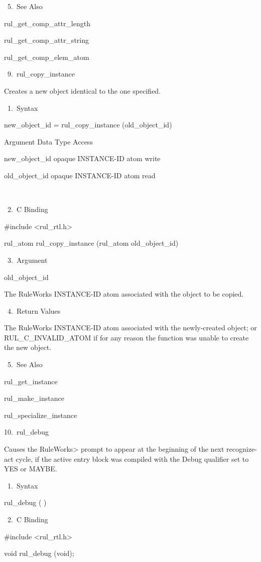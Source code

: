        5. See Also

    rul_get_comp_attr_length

    rul_get_comp_attr_string

    rul_get_comp_elem_atom

 9. rul_copy_instance

    Creates a new object identical to the one
    specified.

       1. Syntax

          new_object_id = rul_copy_instance
          (old_object_id)

          Argument  Data Type     Access

          new_object_id  opaque INSTANCE-ID
          atom  write

          old_object_id  opaque INSTANCE-ID
          atom  read

           

       2. C Binding

          #include <rul_rtl.h>

          rul_atom rul_copy_instance (rul_atom
          old_object_id)

       3. Argument

          old_object_id

          The RuleWorks INSTANCE-ID atom
          associated with the object to be
          copied.

       4. Return Values

          The RuleWorks INSTANCE-ID atom
          associated with the newly-created
          object; or RUL_C_INVALID_ATOM if for
          any reason the function was unable
          to create the new object.

       5. See Also

    rul_get_instance

    rul_make_instance

    rul_specialize_instance

10. rul_debug

    Causes the RuleWorks> prompt to appear at
    the beginning of the next recognize-act
    cycle, if the active entry block was
    compiled with the Debug qualifier set to
    YES or MAYBE.

       1. Syntax

          rul_debug ( )

       2. C Binding

          #include <rul_rtl.h>

          void rul_debug (void);


